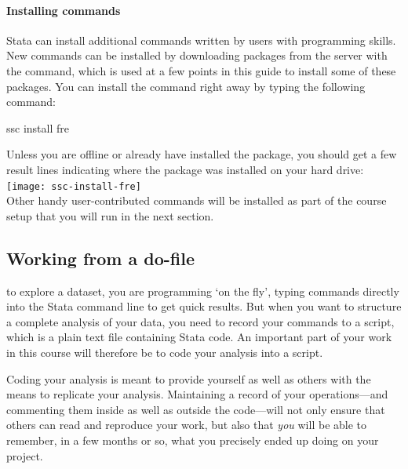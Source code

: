 %
%
\paragraph{Installing commands}%

Stata can install additional commands written by users with programming skills. New commands can be installed by downloading packages from the \SSC server with the  command, which is used at a few points in this guide to install some of these packages. You can install the  command right away by typing the following command:%
	
\begin{docspec}
	ssc install fre
\end{docspec}
	
Unless you are offline or already have installed the  package, you should get a few result lines indicating where the package was installed on your hard drive:\\[1em]%
	
\texttt{[image: ssc-install-fre]}\\[1em]
	
Other handy user-contributed commands will be installed as part of the course setup that you will run in the next section.%

%
%
\subsection{Working from a do-file}%
	\label{sec:do-files}%
%
%

 to explore a dataset, you are programming `on the fly', typing commands directly into the Stata command line to get quick results. But when you want to structure a complete analysis of your data, you need to record your commands to a script, which is a plain text file containing Stata code. An important part of your work in this course will therefore be to code your analysis into a script.%

Coding your analysis is meant to provide yourself as well as others with the means to replicate your analysis. Maintaining a record of your operations—and commenting them inside as well as outside the code—will not only ensure that others can read and reproduce your work, but also that \emph{you} will be able to remember, in a few months or so, what you precisely ended up doing on your project.%

